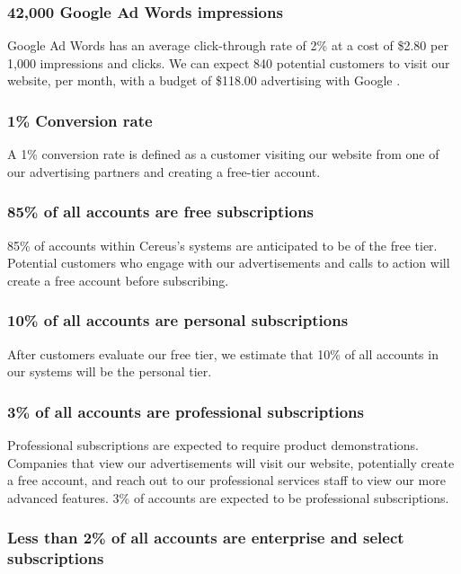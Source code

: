 \subsubsection*{42,000 Google Ad Words impressions}

Google Ad Words has an average click-through rate of 2\% at a cost of \$2.80 per 1,000 impressions and clicks. We can expect 840 potential customers to visit our website, per month, with a budget of \$118.00 advertising with Google \cite{adstag.2020}.

\subsubsection*{1\% Conversion rate}

A 1\% conversion rate is defined as a customer visiting our website from one of our advertising partners and creating a free-tier account.

\subsubsection*{85\% of all accounts are free subscriptions}

85\% of accounts within Cereus's systems are anticipated to be of the free tier. Potential customers who engage with our advertisements and calls to action will create a free account before subscribing.

\subsubsection*{10\% of all accounts are personal subscriptions}

After customers evaluate our free tier, we estimate that 10\% of all accounts in our systems will be the personal tier.

\subsubsection*{3\% of all accounts are professional subscriptions}

Professional subscriptions are expected to require product demonstrations. Companies that view our advertisements will visit our website, potentially create a free account, and reach out to our professional services staff to view our more advanced features. 3\% of accounts are expected to be professional subscriptions. 

\subsubsection*{Less than 2\% of all accounts are enterprise and select subscriptions}

